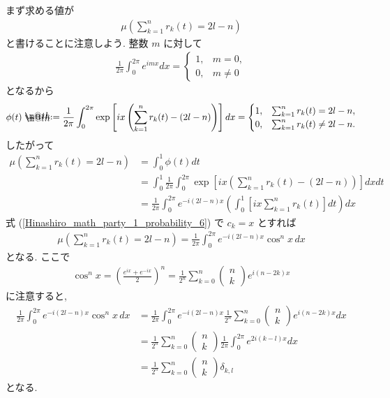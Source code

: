 \documentclass[openany, a4paper, oneside]{jsbook}
\makeatletter
\newcommand*{\defeq}{\mathrel{\rlap{%
\raisebox{0.3ex}{$\m@th\cdot$}}%
\raisebox{-0.3ex}{$\m@th\cdot$}}%
=}
\theoremstyle{break}
\theoremstyle{breakdefn}
\newcommand{\rbk}[1]{\left (#1\right)}
\newcommand{\sqbk}[1]{\left[#1\right]}
\makeatother
\begin{document}
まず求める値が
\begin{align}
 \mu \rbk{\sum_{k=1}^{n} r_k (t) = 2l - n}
\end{align}
と書けることに注意しよう.
整数 $m$ に対して
\begin{align}
 \frac{1}{2 \pi} \int_0^{2 \pi} e^{imx} dx
 =
 \begin{cases}
  1, & m=0, \\
  0, & m \neq 0
 \end{cases}
\end{align}
となるから
\begin{align}
 \phi (t)
 \defeq
 \frac{1}{2 \pi} \int_0^{2 \pi} \exp \sqbk{ix \rbk{\sum_{k=1}^{n} r_k (t) - \rbk{2l-n}}} dx
 =
 \begin{cases}
  1, &  \sum_{k=1}^{n} r_k (t) = 2l - n, \\
  0, &  \sum_{k=1}^{n} r_k (t) \neq 2l - n.
 \end{cases}
\end{align}
したがって
\begin{align}
 \mu \rbk{\sum_{k=1}^n r_k (t) = 2 l - n}
 &=
 \int_0^1 \phi (t) dt \\
 &=
 \int_0^1 \frac{1}{2 \pi} \int_0^{2 \pi} \exp \sqbk{ix \rbk{\sum_{k=1}^{n} r_k (t) - \rbk{2l-n}}} dx dt \\
 &=
 \frac{1}{2 \pi} \int_0^{2 \pi} e^{-i (2l -n) x} \rbk{\int_0^1 \sqbk{ix \sum_{k=1}^{n} r_k (t)} dt} dx
\end{align}
式 (\ref{Hinashiro_math_party_1_probability_6}) で $c_k = x$ とすれば
\begin{align}
 \mu \rbk{\sum_{k=1}^n r_k (t) = 2 l - n}
 =
 \frac{1}{2 \pi} \int_0^{2 \pi} e^{-i (2l -n) x} \cos^n x \, dx
\end{align}
となる.
ここで
\begin{align}
 \cos^n x
 =
 \rbk{\frac{e^{ix} + e^{-ix}}{2}}^n
 =
 \frac{1}{2^n} \sum_{k=0}^n
 \begin{pmatrix}
  n \\
  k
 \end{pmatrix}
 e^{i (n - 2k) x}
\end{align}
に注意すると,
\begin{align}
 \frac{1}{2 \pi} \int_0^{2 \pi} e^{-i (2l -n) x} \cos^n x \, dx
 &=
 \frac{1}{2 \pi} \int_0^{2 \pi} e^{-i (2l -n) x}
  \frac{1}{2^n} \sum_{k=0}^n
  \begin{pmatrix}
   n \\
   k
  \end{pmatrix}
  e^{i (n - 2k) x} dx \\
 &=
 \frac{1}{2^n} \sum_{k=0}^n
  \begin{pmatrix}
   n \\
   k
  \end{pmatrix}
  \frac{1}{2 \pi}
  \int_0^{2 \pi} e^{2 i (k - l) x} dx \\
 &=
 \frac{1}{2^n} \sum_{k=0}^n
  \begin{pmatrix}
   n \\
   k
  \end{pmatrix}
  \delta_{k,l}
\end{align}
となる.
\end{document}
